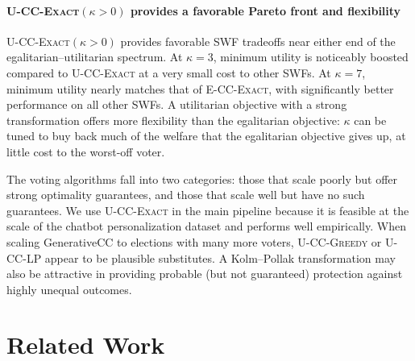 \documentclass[letterpaper]{article} %
\newcommand{\Exact}{\textsc{U-CC-Exact}}
\newcommand{\ExactP}{\textsc{U-CC-Exact}$(\kappa>0)$}
\newcommand{\Greedy}{\textsc{U-CC-Greedy}}
\newcommand{\LP}{\textsc{U-CC-LP}}
\newcommand{\ECCExact}{\textsc{E-CC-Exact}}
\begin{document}
\paragraph{\ExactP{} provides a favorable Pareto front and flexibility}
\ExactP{} provides favorable SWF tradeoffs near either end of the egalitarian--utilitarian spectrum.
At \(\kappa=3\), minimum utility is noticeably boosted compared to \Exact{} at a very small cost to other SWFs.
At \(\kappa=7\), minimum utility nearly matches that of \ECCExact{}, with significantly better performance on all other SWFs.
A utilitarian objective with a strong transformation offers more flexibility than the egalitarian objective: \(\kappa\) can be tuned to buy back much of the welfare that the egalitarian objective gives up, at little cost to the worst-off voter.

The voting algorithms fall into two categories: those that scale poorly but offer strong optimality guarantees, and those that scale well but have no such guarantees.
We use \Exact{} in the main pipeline because it is feasible at the scale of the chatbot personalization dataset and performs well empirically.
When scaling GenerativeCC to elections with many more voters, \Greedy{} or \LP{} appear to be plausible substitutes.
A Kolm--Pollak transformation may also be attractive in providing probable (but not guaranteed) protection against highly unequal outcomes.

\section{Related Work}
\end{document}
